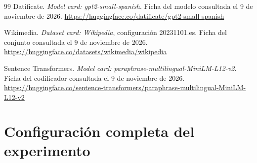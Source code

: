 \documentclass[12pt,letterpaper]{article}
\begin{document}
\begin{thebibliography}{99}
Datificate. \textit{Model card: gpt2-small-spanish}.
Ficha del modelo consultada el 9 de noviembre de 2026.
\url{https://huggingface.co/datificate/gpt2-small-spanish}

Wikimedia. \textit{Dataset card: Wikipedia}, configuración 20231101.es.
Ficha del conjunto consultada el 9 de noviembre de 2026.
\url{https://huggingface.co/datasets/wikimedia/wikipedia}

Sentence Transformers. \textit{Model card: paraphrase-multilingual-MiniLM-L12-v2}.
Ficha del codificador consultada el 9 de noviembre de 2026.
\url{https://huggingface.co/sentence-transformers/paraphrase-multilingual-MiniLM-L12-v2}

\end{thebibliography}

\clearpage
\appendix
\renewcommand{\thesection}{\Alph{section}}

\section{Configuración completa del experimento}
\end{document}
